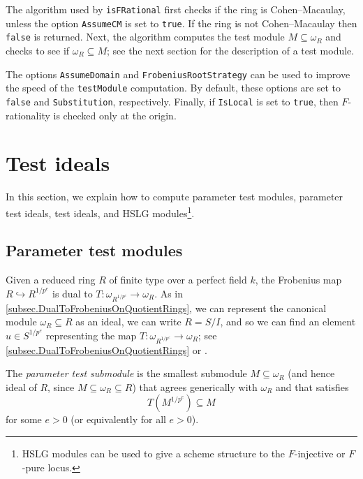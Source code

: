 \documentclass{amsart}
\begin{document}
The algorithm used by \texttt{isFRational} first checks if the ring is Cohen--Macaulay, unless the option \texttt{AssumeCM} is set to \texttt{true}. If the ring
is not Cohen--Macaulay then \texttt{false} is returned. Next, the algorithm
computes the test module $M \subseteq \omega_{R}$ and checks to see if
$\omega_{R} \subseteq M$;  see the next section for the description of a test module.


The options \texttt{AssumeDomain} and \texttt{FrobeniusRootStrategy} can be
used to improve the speed of the \texttt{testModule} computation. By default,
these options are set to \texttt{false} and \texttt{Substitution}, respectively.
Finally, if \texttt{IsLocal} is set to \texttt{true}, then $F$-rationality is checked only at the origin.


\section{Test ideals}\label{Section: Test Ideals}

In this section, we explain how to compute parameter test modules, parameter test ideals, test ideals, and HSLG modules\footnote{HSLG modules can be used to give a scheme structure to the $F$-injective or $F$-pure locus.}.

\subsection{Parameter test modules}
%
%
Given a reduced ring $R$ of finite type over a perfect field $k$, the Frobenius map $R \hookrightarrow R^{1/p^e}$ is dual to $T : \omega_{R^{1/p^e}} \to \omega_R$.  As in \autoref{subsec.DualToFrobeniusOnQuotientRings}, we can represent the canonical module $\omega_R \subseteq R$ as an ideal, we can write $R = S/I$, and so we can find an element $u \in S^{1/p^e}$ representing the map $T:\omega_{R^{1/p^e}} \to \omega_R$; see \autoref{subsec.DualToFrobeniusOnQuotientRings} or \cite{KatzmanParameterTestIdealOfCMRings}.

\begin{definition}
   The \emph{parameter test submodule} is the smallest submodule $M \subseteq \omega_R$ (and hence ideal of $R$, since $M \subseteq \omega_R \subseteq R$) that agrees generically with $\omega_R$ and that satisfies
\[
T (M^{1/p^e}) \subseteq M
\]
for some $e > 0$ (or equivalently for all $e > 0$).
\end{definition}
\end{document}
